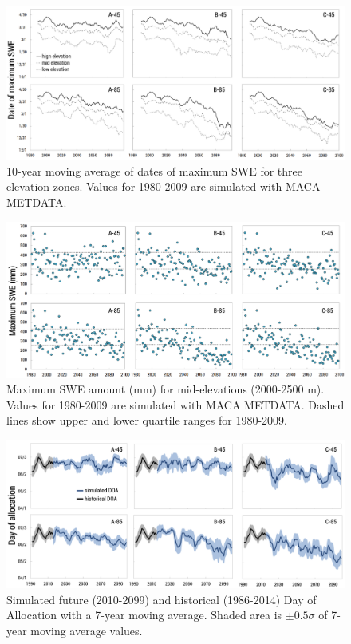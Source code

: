 \documentclass[water,article,submit,moreauthors,pdftex,10pt,a4paper]{mdpi}
\theoremstyle{mdpi}
\newcounter{ex}
\newcounter{re}
\theoremstyle{mdpidefinition}
\begin{document}
\begin{figure}
\centering
\includegraphics[width=\textwidth]{figure-files/figure13.png}
\caption{10-year moving average of dates of maximum SWE for three elevation zones. Values for 1980-2009 are simulated with MACA METDATA.}
\label{fig:MaxSWEDate}
\end{figure}
\clearpage

\begin{figure}
\centering
\includegraphics[width=\textwidth]{figure-files/figure14.png}
\caption{Maximum SWE amount (mm) for mid-elevations (2000-2500 m). Values for 1980-2009 are simulated with MACA METDATA. Dashed lines show upper and lower quartile ranges for 1980-2009.}
\label{fig:MaxSWEMidElev}
\end{figure}
\clearpage

\begin{figure}
\centering
\includegraphics[width=\textwidth]{figure-files/figure15.png}
\caption{Simulated future (2010-2099) and historical (1986-2014) Day of Allocation with a 7-year moving average. Shaded area is $\pm 0.5\sigma$ of 7-year moving average values.}
\label{fig:FutureDayOfAllocation}
\end{figure}
\clearpage
\end{document}
